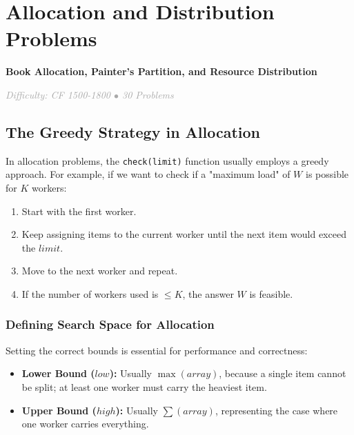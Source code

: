 \documentclass[11pt,a4paper,oneside]{book}
\begin{document}
\newpage


\chapter{Allocation and Distribution Problems}

\begin{tcolorbox}[
    enhanced,
    colback=white,
    colframe=secondaryblue,
    boxrule=1pt,
    arc=2mm,
    left=10pt,
    right=10pt
]
\textbf{\large\textcolor{primaryblue}{Book Allocation, Painter's Partition, and Resource Distribution}}
\end{tcolorbox}

\vspace{0.5cm}

\begin{center}
\textit{\textcolor{darkgray}{Difficulty: CF 1500-1800 $\bullet$ 30 Problems}}
\end{center}

\section{The Greedy Strategy in Allocation}

In allocation problems, the \texttt{check(limit)} function usually employs a greedy approach. For example, if we want to check if a "maximum load" of $W$ is possible for $K$ workers:
\begin{enumerate}
    \item Start with the first worker.
    \item Keep assigning items to the current worker until the next item would exceed the $limit$.
    \item Move to the next worker and repeat.
    \item If the number of workers used is $\leq K$, the answer $W$ is feasible.
\end{enumerate}



\subsection{Defining Search Space for Allocation}
Setting the correct bounds is essential for performance and correctness:
\begin{itemize}
    \item \textbf{Lower Bound ($low$):} Usually $\max(array)$, because a single item cannot be split; at least one worker must carry the heaviest item.
    \item \textbf{Upper Bound ($high$):} Usually $\sum(array)$, representing the case where one worker carries everything.
\end{itemize}
\end{document}

